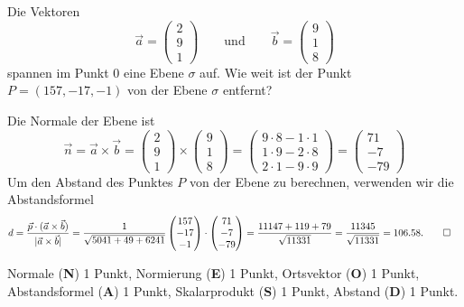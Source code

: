 Die Vektoren
\[
\vec a
=
\begin{pmatrix}2\\9\\1\end{pmatrix}
\qquad
\text{und}
\qquad
\vec b
=
\begin{pmatrix}9\\1\\8\end{pmatrix}
\]
spannen im Punkt $0$ eine Ebene $\sigma$ auf. Wie weit ist der Punkt
$P=(157,-17,-1)$ von der Ebene $\sigma$ entfernt?

\begin{loesung}
Die Normale der Ebene ist
\[
\vec n=
\vec a\times\vec b
=
\begin{pmatrix}2\\9\\1\end{pmatrix}
\times
\begin{pmatrix}9\\1\\8\end{pmatrix}
=
\begin{pmatrix}
9\cdot 8-1\cdot 1\\
1\cdot 9-2\cdot 8\\
2\cdot 1-9\cdot 9
\end{pmatrix}
=
\begin{pmatrix}
71\\-7\\-79
\end{pmatrix}
\]
Um den Abstand des Punktes $P$ von der Ebene zu berechnen, verwenden
wir die Abstandsformel
\begin{align*}
d&=\frac{\vec p\cdot (\vec a\times\vec b)}{|\vec a\times\vec b|}
=\frac1{\sqrt{5041+49+6241}}\begin{pmatrix}157\\-17\\-1\end{pmatrix}\cdot
\begin{pmatrix}
71\\-7\\-79
\end{pmatrix}
=\frac{11147+119+79}{\sqrt{11331}}=\frac{11345}{\sqrt{11331}}=106.58.
\qedhere
\end{align*}
\end{loesung}

\begin{bewertung}
Normale (\textbf{N}) 1 Punkt, Normierung (\textbf{E}) 1 Punkt, 
Ortsvektor (\textbf{O}) 1 Punkt,
Abstandsformel (\textbf{A}) 1 Punkt, Skalarprodukt (\textbf{S}) 1 Punkt,
Abstand (\textbf{D}) 1 Punkt.
\end{bewertung}

